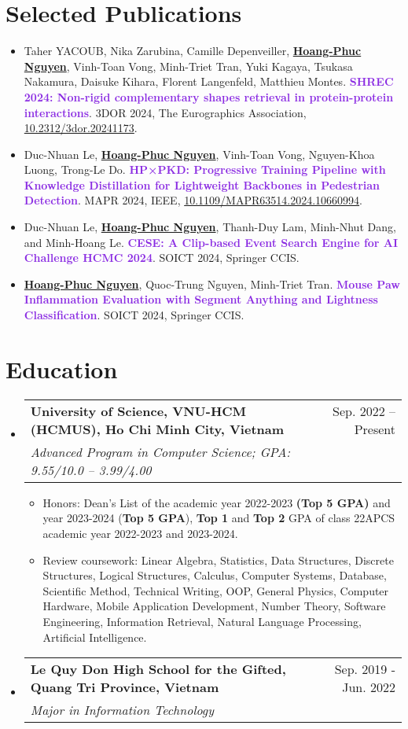 \documentclass[letterpaper,11pt]{article}
\makeatletter
\newcommand{\resumeItem}[1]{
  \item\small{
    {#1 \vspace{-2pt}}
  }
}
\newcommand{\resumeSubhead}[3]{
  \vspace{-1pt}\item
    \begin{tabular*}{0.97\textwidth}{l@{\extracolsep{\fill}}r}
      \textbf{#1} & #2 \\
      \textit{\normalsize#3}
    \end{tabular*}\vspace{-5pt}
}
\newcommand{\resumeSubHeadingListStart}{\begin{itemize}[leftmargin=*]}
\newcommand{\resumeSubHeadingListEnd}{\end{itemize}}
\newcommand{\resumeItemListStart}{\begin{itemize}}
\newcommand{\resumeItemListEnd}{\end{itemize}\vspace{-5pt}}
\makeatother
\begin{document}
\section{Selected Publications}
    \resumeSubHeadingListStart
        \resumeItem{Taher YACOUB, Nika Zarubina, Camille Depenveiller, \underline{\textbf{Hoang-Phuc Nguyen}}, Vinh-Toan Vong, Minh-Triet Tran, Yuki Kagaya, Tsukasa Nakamura, Daisuke Kihara, Florent Langenfeld, Matthieu Montes. \textcolor{BlueViolet}{\textbf{SHREC 2024: Non-rigid complementary shapes retrieval in protein-protein interactions}}. 3DOR 2024, The Eurographics Association, \href{https://dx.doi.org/10.2312/3dor.20241173}{10.2312/3dor.20241173}.}
        \resumeItem{Duc-Nhuan Le, \underline{\textbf{Hoang-Phuc Nguyen}}, Vinh-Toan Vong, Nguyen-Khoa Luong, Trong-Le Do. \textcolor{BlueViolet}{\textbf{HP×PKD: Progressive Training Pipeline with Knowledge Distillation for Lightweight Backbones in Pedestrian Detection}}. MAPR 2024, IEEE, \href{https://doi.org/10.1109/MAPR63514.2024.10660994}{10.1109/MAPR63514.2024.10660994}.}
        \resumeItem{Duc-Nhuan Le, \underline{\textbf{Hoang-Phuc Nguyen}}, Thanh-Duy Lam,
Minh-Nhut Dang, and Minh-Hoang Le. \textcolor{BlueViolet}{\textbf{CESE: A Clip-based Event Search Engine for AI Challenge HCMC 2024}}. SOICT 2024, Springer CCIS.}
        \resumeItem{\underline{\textbf{Hoang-Phuc Nguyen}}, Quoc-Trung Nguyen, Minh-Triet Tran. \textcolor{BlueViolet}{\textbf{Mouse Paw Inflammation Evaluation with Segment Anything and Lightness Classification}}. SOICT 2024, Springer CCIS.}
    \resumeSubHeadingListEnd

\section{Education}
  \resumeSubHeadingListStart
    \resumeSubhead
        {University of Science, VNU-HCM (HCMUS), Ho Chi Minh City, Vietnam}{Sep. 2022 -- Present}
        {Advanced Program in Computer Science;  GPA: 9.55/10.0 -- 3.99/4.00}
        \resumeItemListStart
            \resumeItem{Honors: Dean’s List of the academic year 2022-2023 \textbf{(Top 5 GPA)} and year 2023-2024 (\textbf{Top 5 GPA}), \textbf{Top 1} and \textbf{Top 2} GPA of class 22APCS academic year 2022-2023 and 2023-2024.}
            \resumeItem{Review coursework: Linear Algebra, Statistics, Data Structures, Discrete Structures, Logical Structures, Calculus, Computer Systems, Database, Scientific Method, Technical Writing, OOP, General Physics, Computer Hardware, Mobile Application Development, Number Theory, Software Engineering, Information Retrieval, Natural Language Processing, Artificial Intelligence.}
        \resumeItemListEnd
    \resumeSubhead
        {Le Quy Don High School for the Gifted, Quang Tri Province, Vietnam}{Sep. 2019 - Jun. 2022}
        {Major in Information Technology}
  \resumeSubHeadingListEnd
\end{document}
